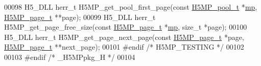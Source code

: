 \begin{DoxyCode}
00098 H5\_DLL herr\_t H5MP\_get\_pool\_first\_page(\textcolor{keyword}{const} \hyperlink{struct_h5_m_p__pool__t}{H5MP\_pool\_t} *\hyperlink{namespaceboost_1_1multiprecision}{mp}, 
      \hyperlink{struct_h5_m_p__page__t}{H5MP\_page\_t} **page);
00099 H5\_DLL herr\_t H5MP\_get\_page\_free\_size(\textcolor{keyword}{const} \hyperlink{struct_h5_m_p__page__t}{H5MP\_page\_t} *\hyperlink{namespaceboost_1_1multiprecision}{mp}, \textcolor{keywordtype}{size\_t} *page);
00100 H5\_DLL herr\_t H5MP\_get\_page\_next\_page(\textcolor{keyword}{const} \hyperlink{struct_h5_m_p__page__t}{H5MP\_page\_t} *page, 
      \hyperlink{struct_h5_m_p__page__t}{H5MP\_page\_t} **next\_page);
00101 \textcolor{preprocessor}{#endif }\textcolor{comment}{/* H5MP\_TESTING */}\textcolor{preprocessor}{}
00102 
00103 \textcolor{preprocessor}{#endif }\textcolor{comment}{/* \_H5MPpkg\_H */}\textcolor{preprocessor}{}
00104 
\end{DoxyCode}
